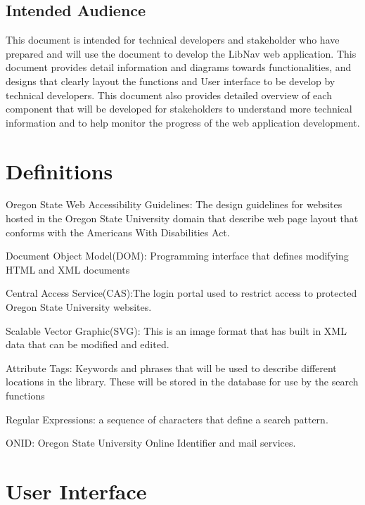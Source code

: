\documentclass[letterpaper,10pt,titlepage, onecolumn, compsoc]{IEEEtran}
\begin{document}
\subsection{Intended Audience}
This document is intended for technical developers and stakeholder who have prepared and will use the document to develop the LibNav web application. This document provides detail information and diagrams towards functionalities, and designs that clearly layout the functions and User interface to be develop by technical developers. This document also provides detailed overview of each component that will be developed for stakeholders to understand more technical information and to help monitor the progress of the web application development.  

\section{Definitions}
Oregon State Web Accessibility Guidelines: The design guidelines for websites hosted in the Oregon State University domain that describe web page layout that conforms with the Americans With Disabilities Act.

Document Object Model(DOM): Programming interface that defines modifying HTML and XML documents

Central Access Service(CAS):The login portal used to restrict access to protected Oregon State University websites.  

Scalable Vector Graphic(SVG): This is an image format that has built in XML data that can be modified and edited.

Attribute Tags: Keywords and phrases that will be used to describe different locations in the library. These will be stored in the database for use by the search functions

Regular Expressions: a sequence of characters that define a search pattern. 

ONID: Oregon State University Online Identifier and mail services.


\section{User Interface}

\end{document}
